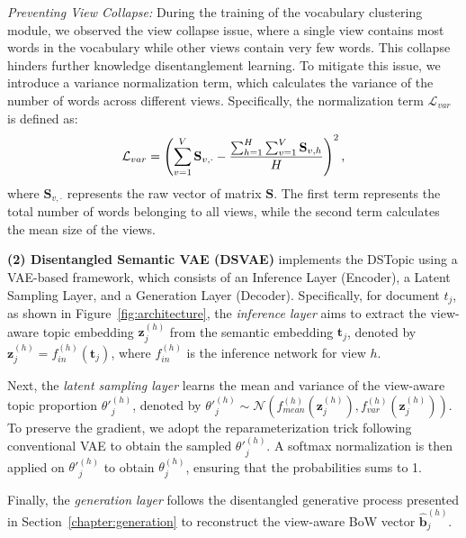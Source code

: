 \textit{Preventing View Collapse:} During the training of the vocabulary clustering module, we observed the view collapse issue, where a single view contains most words in the vocabulary while other views contain very few words. This collapse hinders further knowledge disentanglement learning. To mitigate this issue, we introduce a variance normalization term, which calculates the variance of the number of words across different views. Specifically, the normalization term $\mathcal{L}_{var}$ is defined as:
\begin{align}
\small
    \mathcal{L}_{var} = \left(\sum_{v=1}^V \mathbf{S}_{v, \cdot} - \frac{\sum_{h=1}^H \sum_{v=1}^V \mathbf{S}_{v, h}}{H}\right)^2 ,
\end{align}
where $\mathbf{S}_{v, \cdot}$ represents the raw vector of matrix $\mathbf{S}$. The first term represents the total number of words belonging to all views, while the second term calculates the mean size of the views.

\noindent \textbf{(2) Disentangled Semantic VAE (DSVAE)} implements the DSTopic using a VAE-based framework, which consists of an Inference Layer (Encoder), a Latent Sampling Layer, and a Generation Layer (Decoder). Specifically, for document $t_j$, as shown in Figure~\ref{fig:architecture}, the \textit{inference layer} aims to extract the view-aware topic embedding $\mathbf{z}_j^{(h)}$ from the semantic embedding $\mathbf{t}_j$, denoted by $\mathbf{z}_j^{(h)} = f_{in}^{(h)}(\mathbf{t}_j)$, where $f_{in}^{(h)}$ is the inference network for view $h$. 

Next, the \textit{latent sampling layer} learns the mean and variance of the view-aware topic proportion $\theta'^{(h)}_j$, denoted by $\theta'^{(h)}_j \sim \mathcal{N}(f_{mean}^{(h)}(\mathbf{z}_j^{(h)}), f_{var}^{(h)}(\mathbf{z}_j^{(h)}))$. To preserve the gradient, we adopt the reparameterization trick following conventional VAE \cite{kingma2013auto} to obtain the sampled $\theta'^{(h)}_j$. A softmax normalization is then applied on $\theta'^{(h)}_j$ to obtain $\theta^{(h)}_j$, ensuring that the probabilities sums to 1. 

Finally, the \textit{generation layer} follows the disentangled generative process presented in Section~\ref{chapter:generation} to reconstruct the view-aware BoW vector $\hat{\mathbf{b}}_j^{(h)}$.

